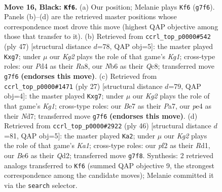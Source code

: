 \documentclass[11pt]{article}
\begin{document}
\clearpage

\begin{figure}[p]\centering
\begin{subfigure}{0.46\textwidth}\centering
\resizebox{\linewidth}{!}{%
\newchessgame
\chessboard[
  setfen={1rr5/ppp1bpkQ/1n1qb3/8/P2pP3/2N3P1/1P3PB1/R1B1K2R b KQ - 0 16},
  showmover=false,
  pgfstyle=straightmove, color=movearrow, markmove={g7-f6}
]}
\caption{}
\end{subfigure}\hfill
\begin{subfigure}{0.46\textwidth}\centering
\resizebox{\linewidth}{!}{%
\newchessgame
\chessboard[
  setfen={r1q2rk1/1p2ppB1/p1b3p1/1n6/1P2N3/4Q1PP/5PBK/1R1R4 b - - 0 24},
  showmover=false,
  pgfstyle=straightmove, color=movearrow, markmove={g8-g7}
]}
\caption{}
\end{subfigure}
\\[4pt]
\begin{subfigure}{0.46\textwidth}\centering
\resizebox{\linewidth}{!}{%
\newchessgame
\chessboard[
  setfen={r1r3k1/p2nppBp/6p1/1Qq2b2/8/2N1P3/PP3PPP/R3KB1R b KQ - 0 14},
  showmover=false,
  pgfstyle=straightmove, color=movearrow, markmove={g8-g7}
]}
\caption{}
\end{subfigure}\hfill
\begin{subfigure}{0.46\textwidth}\centering
\resizebox{\linewidth}{!}{%
\newchessgame
\chessboard[
  setfen={r4r1k/2q3pp/p1Np1b2/3Ppb1n/2B5/P3BP2/1P1Q3P/K2R3R w - - 3 24},
  showmover=false,
  pgfstyle=straightmove, color=movearrow, markmove={a1-a2}
]}
\caption{}
\end{subfigure}
\caption{\textbf{Move 16, Black: \texttt{Kf6}.} (a) Our position; Melanie plays \texttt{Kf6} (\texttt{g7f6}). Panels (b)--(d) are the retrieved master positions whose correspondence most drove this move (highest QAP objective among those that transfer to it). (b) Retrieved from \texttt{ccrl\_top\_p0000\#542} (ply 47) [structural distance $d$=78, QAP obj=5]: the master played \texttt{Kxg7}; under $\mu$ our \emph{Kg2} plays the role of that game's \emph{Kg1}; cross-type roles: our \emph{P}d4 as their \emph{R}a8, our \emph{N}b6 as their \emph{Q}c8; transferred move \texttt{g7f6} \textbf{(endorses this move)}. (c) Retrieved from \texttt{ccrl\_top\_p0000\#1471} (ply 27) [structural distance $d$=79, QAP obj=4]: the master played \texttt{Kxg7}; under $\mu$ our \emph{Kg2} plays the role of that game's \emph{Kg1}; cross-type roles: our \emph{B}e7 as their \emph{P}a7, our \emph{p}e4 as their \emph{N}d7; transferred move \texttt{g7f6} \textbf{(endorses this move)}. (d) Retrieved from \texttt{ccrl\_top\_p0000\#2922} (ply 46) [structural distance $d$=81, QAP obj=5]: the master played \texttt{Ka2}; under $\mu$ our \emph{Kg2} plays the role of that game's \emph{Ka1}; cross-type roles: our \emph{p}f2 as their \emph{R}d1, our \emph{B}e6 as their \emph{Q}d2; transferred move \texttt{g7f8}. Synthesis: 2 retrieved analogs transferred to \texttt{Kf6} (summed QAP objective 9, the strongest correspondence among the candidate moves); Melanie committed it via the \texttt{search} selector.}
\label{fig:thought-m31}
\end{figure}
\end{document}
